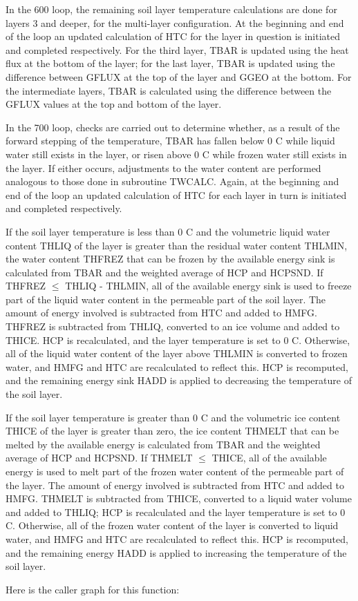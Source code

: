 In the 600 loop, the remaining soil layer temperature calculations are done for layers 3 and deeper, for the multi-\/layer configuration. At the beginning and end of the loop an updated calculation of H\+T\+C for the layer in question is initiated and completed respectively. For the third layer, T\+B\+A\+R is updated using the heat flux at the bottom of the layer; for the last layer, T\+B\+A\+R is updated using the difference between G\+F\+L\+U\+X at the top of the layer and G\+G\+E\+O at the bottom. For the intermediate layers, T\+B\+A\+R is calculated using the difference between the G\+F\+L\+U\+X values at the top and bottom of the layer.

In the 700 loop, checks are carried out to determine whether, as a result of the forward stepping of the temperature, T\+B\+A\+R has fallen below 0 C while liquid water still exists in the layer, or risen above 0 C while frozen water still exists in the layer. If either occurs, adjustments to the water content are performed analogous to those done in subroutine T\+W\+C\+A\+L\+C. Again, at the beginning and end of the loop an updated calculation of H\+T\+C for each layer in turn is initiated and completed respectively.

If the soil layer temperature is less than 0 C and the volumetric liquid water content T\+H\+L\+I\+Q of the layer is greater than the residual water content T\+H\+L\+M\+I\+N, the water content T\+H\+F\+R\+E\+Z that can be frozen by the available energy sink is calculated from T\+B\+A\+R and the weighted average of H\+C\+P and H\+C\+P\+S\+N\+D. If T\+H\+F\+R\+E\+Z $\leq$ T\+H\+L\+I\+Q -\/ T\+H\+L\+M\+I\+N, all of the available energy sink is used to freeze part of the liquid water content in the permeable part of the soil layer. The amount of energy involved is subtracted from H\+T\+C and added to H\+M\+F\+G. T\+H\+F\+R\+E\+Z is subtracted from T\+H\+L\+I\+Q, converted to an ice volume and added to T\+H\+I\+C\+E. H\+C\+P is recalculated, and the layer temperature is set to 0 C. Otherwise, all of the liquid water content of the layer above T\+H\+L\+M\+I\+N is converted to frozen water, and H\+M\+F\+G and H\+T\+C are recalculated to reflect this. H\+C\+P is recomputed, and the remaining energy sink H\+A\+D\+D is applied to decreasing the temperature of the soil layer.

If the soil layer temperature is greater than 0 C and the volumetric ice content T\+H\+I\+C\+E of the layer is greater than zero, the ice content T\+H\+M\+E\+L\+T that can be melted by the available energy is calculated from T\+B\+A\+R and the weighted average of H\+C\+P and H\+C\+P\+S\+N\+D. If T\+H\+M\+E\+L\+T $\leq$ T\+H\+I\+C\+E, all of the available energy is used to melt part of the frozen water content of the permeable part of the layer. The amount of energy involved is subtracted from H\+T\+C and added to H\+M\+F\+G. T\+H\+M\+E\+L\+T is subtracted from T\+H\+I\+C\+E, converted to a liquid water volume and added to T\+H\+L\+I\+Q; H\+C\+P is recalculated and the layer temperature is set to 0 C. Otherwise, all of the frozen water content of the layer is converted to liquid water, and H\+M\+F\+G and H\+T\+C are recalculated to reflect this. H\+C\+P is recomputed, and the remaining energy H\+A\+D\+D is applied to increasing the temperature of the soil layer.

Here is the caller graph for this function\+:


